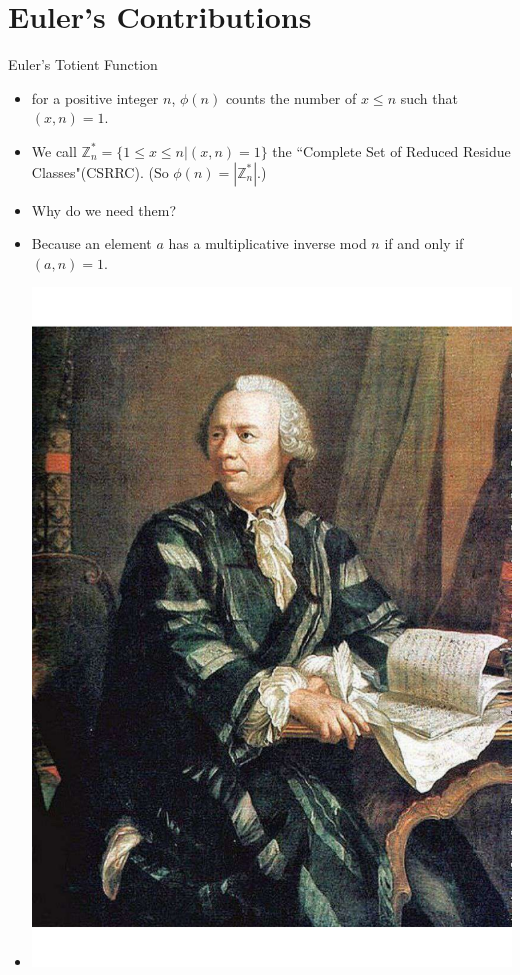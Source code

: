 \documentclass[ %
 usenames,dvipsnames,
aspectratio=169,11pt ]{beamer}
\newenvironment{stepitemize}{\begin{itemize}[<+->]}{\end{itemize} }
\newcommand{\Z}{\mathbb{Z}}
\begin{document}
\section{Euler's Contributions}
\begin{frame}{Euler's Totient Function}
\begin{stepitemize}
    \item for a positive integer $n$, $\phi(n)$ counts the number of $x\leq n$ such that $(x,n)=1$.
    \item We call $\Z_n^{*} = \{1\leq x\leq n| (x,n)=1\}$ the ``Complete Set of Reduced Residue Classes"(CSRRC). (So $\phi(n)=|\Z_n^{*}|$.)
    \item Why do we need them?
    \item Because an element $a$ has a multiplicative inverse mod $n$ if and only if $(a,n)=1$.
    \item[]     \begin{center}
    \includegraphics[scale=.170]{Leonhard-Euler.pdf}
\end{center}

\end{stepitemize}

\end{frame}
\end{document}
